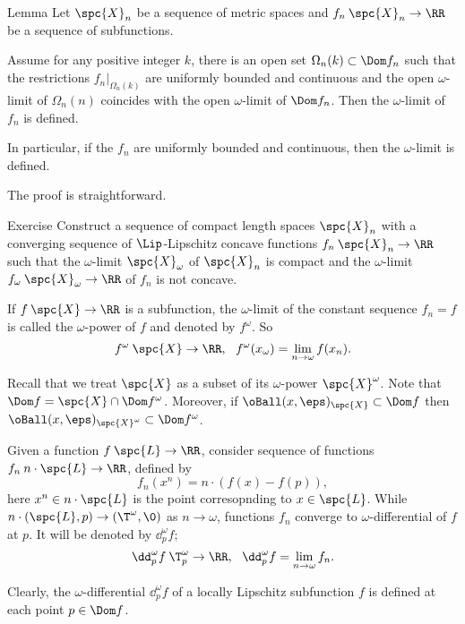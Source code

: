 \begin{thm}{Lemma}
Let $\spc{X}_n$ be a sequence of metric spaces
and $f_n\:\spc{X}_n\to\RR$ be a sequence of subfunctions.

Assume for any positive integer $k$, there is an open set $\Omega_n(k)\subset \Dom f_n$
such that the restrictions $f_n|_{\Omega_n(k)}$ are uniformly bounded and continuous
and the open $\omega$-limit of $\Omega_n(n)$ coincides with the open $\omega$-limit of $\Dom f_n$.
Then the $\omega$-limit of $f_n$ is defined.

In particular, if the $f_n$ are uniformly bounded and continuous, then the $\omega$-limit is defined.
\end{thm}

The proof is straightforward.

{\sloppy

\begin{thm}{Exercise}\label{ex:nonconvex-limit}
Construct a sequence of compact length spaces 
$\spc{X}_n$  
with a converging sequence of $\Lip$-Lipschitz concave functions $f_n\:\spc{X}_n\to\RR$ such that
the $\omega$-limit $\spc{X}_\omega$ of $\spc{X}_n$ is compact
and the $\omega$-limit $f_\omega\:\spc{X}_\omega\to\RR$ of $f_n$ is not concave.
\end{thm}

}

If $f\:\spc{X}\to\RR$ is a subfunction, 
the $\omega$-limit of the constant sequence $f_n=f$ is called the $\omega$-power of $f$ and denoted by $f^\omega$.
So
\[f^\omega\:\spc{X}\to\RR,\ \ f^\omega(x_\omega)=\lim_{n\to\omega} f(x_n).\]

Recall that we treat $\spc{X}$ as a subset of its $\omega$-power $\spc{X}^\omega$.
Note that $\Dom f=\spc{X}\cap \Dom f^\omega$.
Moreover, 
if $\oBall(x,\eps)_{\spc{X}}\subset \Dom f$
then $\oBall(x,\eps)_{\spc{X}^\omega}\subset \Dom f^\omega$.


Given a function $f\:\spc{L}\to\RR$, consider sequence of functions $f_n\:n\cdot\spc{L}\to\RR$, defined by 
\[f_n(x^n)=n\cdot(f(x)-f(p)),\]
here $x^n\in n\cdot\spc{L}$ is the point corresopnding to $x\in\spc{L}$.
While $n\cdot(\spc{L},p)\to(\T^\omega,\0)$ as $n\to\omega$, 
functions $f_n$ converge to $\omega$-differential of $f$ at $p$.
It will be denoted by $\dd_p^\omega f$;
\[\dd_p^\omega f\:\T_p^\omega\to\RR,\ \ \dd_p^\omega f=\lim_{n\to\omega} f_n.\] 

Clearly, the $\omega$-differential $\dd_p^\omega f$ of a locally Lipschitz subfunction $f$ is defined at each point $p\in \Dom f$.
















